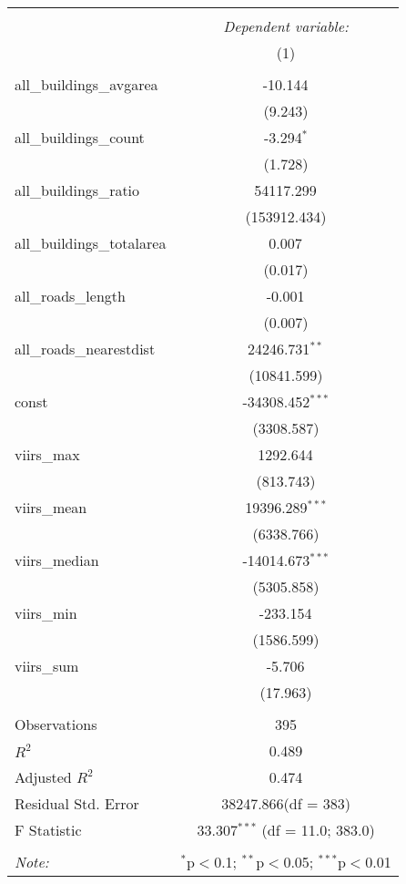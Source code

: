 \begin{table}[!htbp] \centering
\begin{tabular}{@{\extracolsep{5pt}}lc}
\\[-1.8ex]\hline
\hline \\[-1.8ex]
& \multicolumn{1}{c}{\textit{Dependent variable:}} \
\cr \cline{1-2}
\\[-1.8ex] & (1) \\
\hline \\[-1.8ex]
 all_buildings_avgarea & -10.144$^{}$ \\
  & (9.243) \\
 all_buildings_count & -3.294$^{*}$ \\
  & (1.728) \\
 all_buildings_ratio & 54117.299$^{}$ \\
  & (153912.434) \\
 all_buildings_totalarea & 0.007$^{}$ \\
  & (0.017) \\
 all_roads_length & -0.001$^{}$ \\
  & (0.007) \\
 all_roads_nearestdist & 24246.731$^{**}$ \\
  & (10841.599) \\
 const & -34308.452$^{***}$ \\
  & (3308.587) \\
 viirs_max & 1292.644$^{}$ \\
  & (813.743) \\
 viirs_mean & 19396.289$^{***}$ \\
  & (6338.766) \\
 viirs_median & -14014.673$^{***}$ \\
  & (5305.858) \\
 viirs_min & -233.154$^{}$ \\
  & (1586.599) \\
 viirs_sum & -5.706$^{}$ \\
  & (17.963) \\
\hline \\[-1.8ex]
 Observations & 395 \\
 $R^2$ & 0.489 \\
 Adjusted $R^2$ & 0.474 \\
 Residual Std. Error & 38247.866(df = 383)  \\
 F Statistic & 33.307$^{***}$ (df = 11.0; 383.0) \\
\hline
\hline \\[-1.8ex]
\textit{Note:} & \multicolumn{1}{r}{$^{*}$p$<$0.1; $^{**}$p$<$0.05; $^{***}$p$<$0.01} \\
\end{tabular}
\end{table}